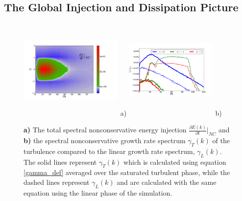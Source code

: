 \documentclass[showpacs,preprintnumbers,amsmath,amssymb,superscriptaddress]{revtex4}
\newcommand{\pdiff}[2]{\frac{\partial#1}{\partial#2}}
\begin{document}
\subsection{The Global Injection and Dissipation Picture}

\begin{figure}
\includegraphics[width=0.45\textwidth,height=50mm]{dEdt_nc}~a)
\hfil
\includegraphics[width=0.40\textwidth,height=50mm]{lin_vs_nl_standard}~b)
\hfil
\caption{\textbf{a)} The total spectral nonconservative energy injection $\pdiff{E(k)}{t} \big|_{NC}$ and
\textbf{b)} the spectral nonconservative growth rate spectrum $\gamma_{T}(k)$ of the turbulence 
compared to the linear growth rate spectrum, $\gamma_L(k)$. The solid lines represent $\gamma_{T}(k)$ which is calculated using equation \ref{gamma_def} averaged over the saturated turbulent phase, 
while the dashed lines represent $\gamma_L(k)$ and are calculated with the same equation using the linear phase of the simulation.}
\label{dEdt_tot_fig}
\end{figure}
\end{document}
